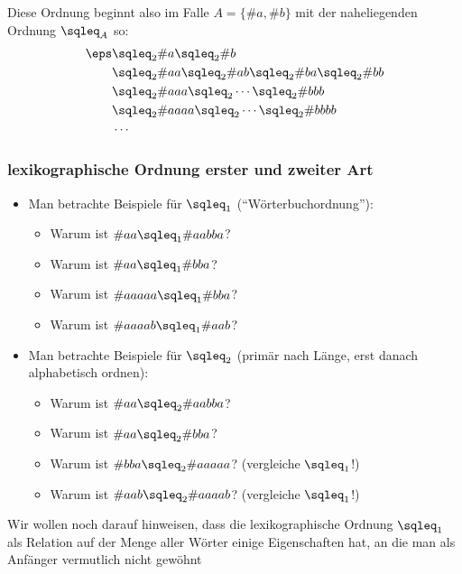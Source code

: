 \begin{itemize}
\begin{itemize}
  \end{itemize}
  Diese Ordnung beginnt also \zB im Falle $A=\{\#a,\#b\}$ mit der
  naheliegenden Ordnung $\sqleq_A$ so:
  \begin{align*}
    \eps &\sqleq_2 \#{a} \sqleq_2 \#{b} \\
    &\sqleq_2 \#{aa} \sqleq_2 \#{ab} \sqleq_2 \#{ba} \sqleq_2 \#{bb}\\
    &\sqleq_2 \#{aaa} \sqleq_2 \cdots \sqleq_2 \#{bbb} \\
    &\sqleq_2 \#{aaaa } \sqleq_2 \cdots \sqleq_2 \#{bbbb} \\
    &\cdots
  \end{align*}
\end{itemize}
%
\begin{tutorium}
  \subsubsection*{lexikographische Ordnung erster und zweiter Art}
  \begin{itemize}
  \item Man betrachte Beispiele für $\sqleq_1$
    ("`Wörterbuchordnung"'):
    \begin{itemize}
    \item  Warum ist $\#{aa} \sqleq_1 \#{aabba}$?
    \item  Warum ist $\#{aa} \sqleq_1 \#{bba}$?
    \item  Warum ist $\#{aaaaa} \sqleq_1 \#{bba}$?
    \item  Warum ist $\#{aaaab} \sqleq_1 \#{aab}$?
    \end{itemize}
  \item Man betrachte Beispiele für $\sqleq_2$ (primär nach Länge,
    erst danach alphabetisch ordnen):
    \begin{itemize}
    \item  Warum ist $\#{aa} \sqleq_2 \#{aabba}$?
    \item  Warum ist $\#{aa} \sqleq_2 \#{bba}$?
    \item  Warum ist $\#{bba} \sqleq_2 \#{aaaaa}$? (vergleiche $\sqleq_1$!)
    \item  Warum ist $\#{aab} \sqleq_2 \#{aaaab}$? (vergleiche $\sqleq_1$!)
    \end{itemize}
  \end{itemize}
\end{tutorium}
%
Wir wollen noch darauf hinweisen, dass die lexikographische Ordnung
$\sqleq_1$ als Relation auf der Menge aller Wörter einige
Eigenschaften hat, an die man als Anfänger vermutlich nicht gewöhnt
